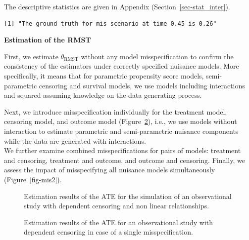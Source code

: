 \documentclass[
  11pt,
  a4paper,
]{article}
\theoremstyle{plain}
\theoremstyle{plain}
\theoremstyle{plain}
\theoremstyle{definition}
\theoremstyle{remark}
\begin{document}
The descriptive statistics are given in Appendix
(Section~\ref{sec-stat_inter}).

\begin{verbatim}
[1] "The ground truth for mis scenario at time 0.45 is 0.26"
\end{verbatim}

\textbf{Estimation of the RMST}

First, we estimate \(\theta_{\mathrm{RMST}}\) without any model
misspecification to confirm the consistency of the estimators under
correctly specified nuisance models. More specifically, it means that
for parametric propensity score models, semi-parametric censoring and
survival models, we use models including interactions and squared
assuming knowledge on the data generating process.

Next, we introduce misspecification individually for the treatment
model, censoring model, and outcome model (Figure~\ref{fig-mis}), i.e.,
we use models without interaction to estimate parametric and
semi-parametric nuisance components while the data are generated with
interactions.\\
We further examine combined misspecifications for pairs of models:
treatment and censoring, treatment and outcome, and outcome and
censoring. Finally, we assess the impact of misspecifying all nuisance
models simultaneously (Figure~\ref{fig-mis2}).

\begin{figure}


\caption{\label{fig-mis3}Estimation results of the ATE for the
simulation of an observational study with dependent censoring and non
linear relationships.}

\end{figure}%

\begin{figure}


\caption{\label{fig-mis}Estimation results of the ATE for an
observational study with dependent censoring in case of a single
misspecification.}

\end{figure}%
\end{document}
